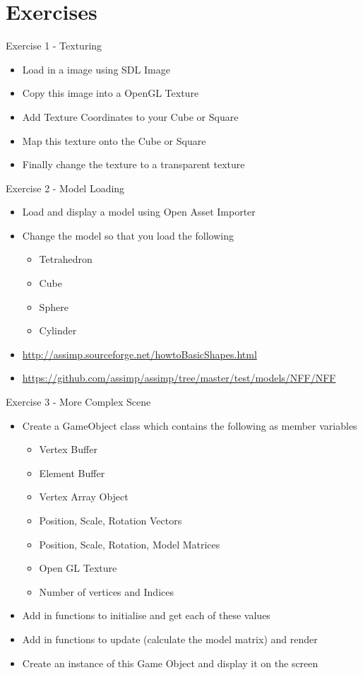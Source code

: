 \part{Exercises}
\frame{\partpage}

\begin{frame}{Exercise 1 - Texturing}
	\begin{itemize}
		\item Load in a image using SDL Image
		\item Copy this image into a OpenGL Texture
		\item Add Texture Coordinates to your Cube or Square
		\item Map this texture onto the Cube or Square
		\item Finally change the texture to a transparent texture
	\end{itemize}
\end{frame}

\begin{frame}{Exercise 2 - Model Loading}
	\begin{itemize}
		\item Load and display a model using Open Asset Importer
		\item Change the model so that you load the following
		\begin{itemize}
			\item Tetrahedron 
			\item Cube
			\item Sphere
			\item Cylinder
		\end{itemize}
		\item \url{http://assimp.sourceforge.net/howtoBasicShapes.html}
		\item \url{https://github.com/assimp/assimp/tree/master/test/models/NFF/NFF}
	\end{itemize}
\end{frame}

\begin{frame}{Exercise 3 - More Complex Scene}
	\begin{itemize}
		\item Create a GameObject class which contains the following as member variables
		\begin{itemize}
			\item Vertex Buffer
			\item Element Buffer
			\item Vertex Array Object
			\item Position, Scale, Rotation Vectors
			\item Position, Scale, Rotation, Model Matrices
			\item Open GL Texture
			\item Number of vertices and Indices
		\end{itemize}
		\item Add in functions to initialise and get each of these values
		\item Add in functions to update (calculate the model matrix) and render
		\item Create an instance of this Game Object and display it on the screen
	\end{itemize}
\end{frame}